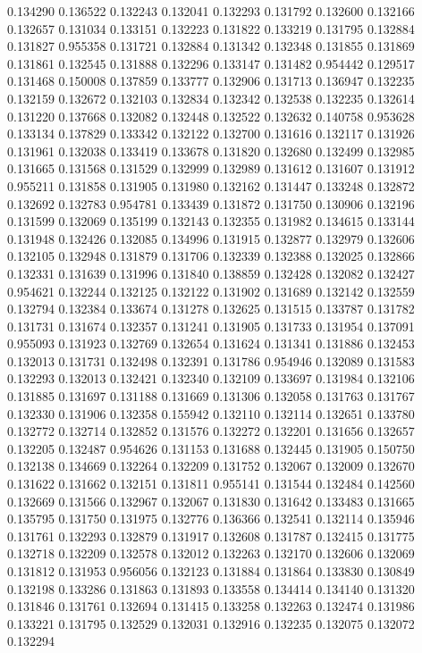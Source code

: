 0.134290
0.136522
0.132243
0.132041
0.132293
0.131792
0.132600
0.132166
0.132657
0.131034
0.133151
0.132223
0.131822
0.133219
0.131795
0.132884
0.131827
0.955358
0.131721
0.132884
0.131342
0.132348
0.131855
0.131869
0.131861
0.132545
0.131888
0.132296
0.133147
0.131482
0.954442
0.129517
0.131468
0.150008
0.137859
0.133777
0.132906
0.131713
0.136947
0.132235
0.132159
0.132672
0.132103
0.132834
0.132342
0.132538
0.132235
0.132614
0.131220
0.137668
0.132082
0.132448
0.132522
0.132632
0.140758
0.953628
0.133134
0.137829
0.133342
0.132122
0.132700
0.131616
0.132117
0.131926
0.131961
0.132038
0.133419
0.133678
0.131820
0.132680
0.132499
0.132985
0.131665
0.131568
0.131529
0.132999
0.132989
0.131612
0.131607
0.131912
0.955211
0.131858
0.131905
0.131980
0.132162
0.131447
0.133248
0.132872
0.132692
0.132783
0.954781
0.133439
0.131872
0.131750
0.130906
0.132196
0.131599
0.132069
0.135199
0.132143
0.132355
0.131982
0.134615
0.133144
0.131948
0.132426
0.132085
0.134996
0.131915
0.132877
0.132979
0.132606
0.132105
0.132948
0.131879
0.131706
0.132339
0.132388
0.132025
0.132866
0.132331
0.131639
0.131996
0.131840
0.138859
0.132428
0.132082
0.132427
0.954621
0.132244
0.132125
0.132122
0.131902
0.131689
0.132142
0.132559
0.132794
0.132384
0.133674
0.131278
0.132625
0.131515
0.133787
0.131782
0.131731
0.131674
0.132357
0.131241
0.131905
0.131733
0.131954
0.137091
0.955093
0.131923
0.132769
0.132654
0.131624
0.131341
0.131886
0.132453
0.132013
0.131731
0.132498
0.132391
0.131786
0.954946
0.132089
0.131583
0.132293
0.132013
0.132421
0.132340
0.132109
0.133697
0.131984
0.132106
0.131885
0.131697
0.131188
0.131669
0.131306
0.132058
0.131763
0.131767
0.132330
0.131906
0.132358
0.155942
0.132110
0.132114
0.132651
0.133780
0.132772
0.132714
0.132852
0.131576
0.132272
0.132201
0.131656
0.132657
0.132205
0.132487
0.954626
0.131153
0.131688
0.132445
0.131905
0.150750
0.132138
0.134669
0.132264
0.132209
0.131752
0.132067
0.132009
0.132670
0.131622
0.131662
0.132151
0.131811
0.955141
0.131544
0.132484
0.142560
0.132669
0.131566
0.132967
0.132067
0.131830
0.131642
0.133483
0.131665
0.135795
0.131750
0.131975
0.132776
0.136366
0.132541
0.132114
0.135946
0.131761
0.132293
0.132879
0.131917
0.132608
0.131787
0.132415
0.131775
0.132718
0.132209
0.132578
0.132012
0.132263
0.132170
0.132606
0.132069
0.131812
0.131953
0.956056
0.132123
0.131884
0.131864
0.133830
0.130849
0.132198
0.133286
0.131863
0.131893
0.133558
0.134414
0.134140
0.131320
0.131846
0.131761
0.132694
0.131415
0.133258
0.132263
0.132474
0.131986
0.133221
0.131795
0.132529
0.132031
0.132916
0.132235
0.132075
0.132072
0.132294
